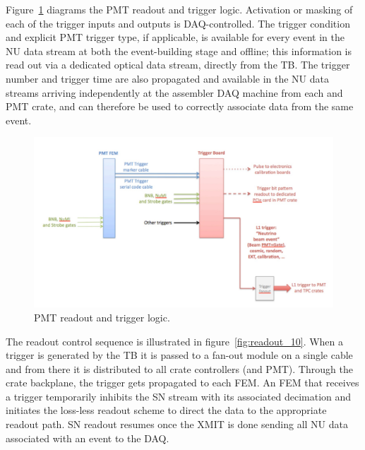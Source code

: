 Figure~\ref{fig:readout_9} diagrams the PMT readout and trigger logic. Activation or masking of each of the trigger inputs and outputs is DAQ-controlled. The trigger condition and explicit PMT trigger type, if applicable, is available for every event in the NU data stream at both the event-building stage and offline; this information is read out via a dedicated optical data stream, directly from the TB. The trigger number and trigger time are also propagated and available in the NU data streams arriving independently at the assembler DAQ machine from each \lartpc and PMT crate, and can therefore be used to correctly associate data from the same event.

\begin{figure}
\centering
\includegraphics[width=0.8\linewidth]{./figures/readout_9.jpg}%
\caption{\label{fig:readout_9}PMT readout and trigger logic.}
\end{figure}

The readout control sequence is illustrated in figure~\ref{fig:readout_10}. When a trigger is generated by the TB it is passed to a fan-out module on a single cable and from there it is distributed to all crate controllers (\lartpc and PMT). Through the crate backplane, the trigger gets propagated to each FEM. An FEM that receives a trigger temporarily inhibits the SN stream with its associated decimation and initiates the loss-less readout scheme to direct the data to the appropriate readout path. SN readout resumes once the XMIT is done sending all NU data associated with an event to the DAQ. 


